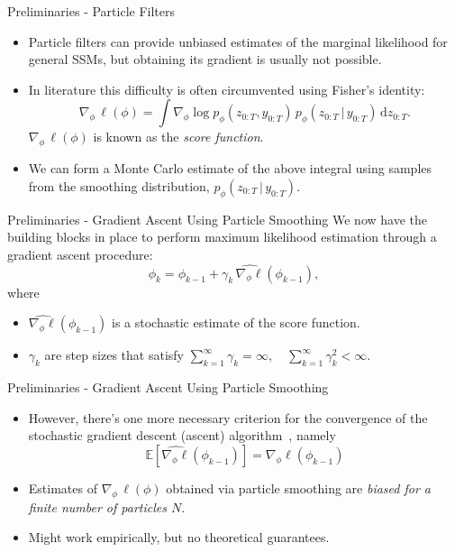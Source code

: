 \documentclass[10pt, aspectratio=1610]{beamer}
\newcommand{\given}{\,|\,}
\newcommand{\dd}{\mathrm{d}}
\begin{document}
    \begin{frame}{Preliminaries - Particle Filters}
      \begin{itemize}[<+->]
        \item Particle filters can provide unbiased estimates of the marginal likelihood for general SSMs, but obtaining its gradient is usually not possible.
        \item In literature this difficulty is often circumvented using Fisher's identity:
          \begin{equation}
            \nabla_\phi \, \ell(\phi) = \int \nabla_\phi \log p_{\phi}(z_{0:T}, y_{0:T}) \, p_\phi(z_{0:T} \given y_{0:T}) \, \dd z_{0:T}.
          \end{equation}
          $\nabla_\phi \, \ell(\phi)$ is known as the \emph{score function}.
        \item We can form a Monte Carlo estimate of the above integral using samples from the smoothing distribution, $p_\phi(z_{0:T} \given y_{0:T})$.
      \end{itemize} 
    \end{frame}

    \begin{frame}{Preliminaries - Gradient Ascent Using Particle Smoothing}
        We now have the building blocks in place to perform maximum likelihood estimation through a gradient ascent procedure:
        \begin{equation}
            \phi_k = \phi_{k-1} + \gamma_k \, \widehat{\nabla_\phi \ell}(\phi_{k-1}),
        \end{equation}
        where
        \begin{itemize}
          \item<2-> $\widehat{\nabla_\phi \ell}(\phi_{k-1})$ is a stochastic estimate of the score function.
          \item<3-> $\gamma_k$ are step sizes that satisfy $\sum_{k=1}^\infty \gamma_k = \infty, \quad \sum_{k=1}^\infty \gamma_k^2 < \infty$.
        \end{itemize}
    \end{frame}

    \begin{frame}{Preliminaries - Gradient Ascent Using Particle Smoothing}
      \begin{itemize}[<+->]
        \item However, there's one more necessary criterion for the convergence of the stochastic gradient descent (ascent) algorithm~\citep{robbins1951stochastic}, namely
          \begin{equation}
            \mathbb{E}\left[\widehat{\nabla_\phi \ell}(\phi_{k-1})\right] = \nabla_\phi \ell(\phi_{k-1})
          \end{equation}
        \item Estimates of $\nabla_\phi \, \ell(\phi)$ obtained via particle smoothing are \emph{biased for a finite number of particles $N$}.
        \item Might work empirically, but no theoretical guarantees.
      \end{itemize}
    \end{frame}
\end{document}
